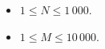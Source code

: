 

\Constraints

\begin{itemize}[nolistsep, itemsep=2mm]
    \item $1 \leq N \leq 1\,000$.
    \item $1 \leq M \leq 10\,000$.
\end{itemize}



\Examples

\begin{example}
\end{example}



